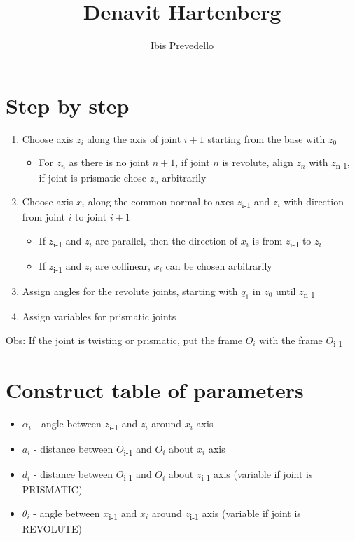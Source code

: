 \documentclass{article}
\begin{document}
\title{Denavit Hartenberg}
\author{Ibis Prevedello}

\maketitle

\section{Step by step}

\begin{enumerate}
	\item Choose axis $z_i$ along the axis of joint $i+1$ starting from the base with $z_0$
	\begin{itemize}
		\item For $z_n$ as there is no joint $n+1$, if joint $n$ is revolute, align $z_n$ with $z$\textsubscript{n-1}, if joint is prismatic chose $z_n$ arbitrarily
	\end{itemize}
	\item Choose axis $x_i$ along the common normal to axes $z$\textsubscript{i-1} and $z_i$ with direction from joint $i$ to joint $i+1$
	\begin{itemize}
		\item If $z$\textsubscript{i-1} and $z_i$ are parallel, then the direction of $x_i$ is from $z$\textsubscript{i-1} to $z_i$
		\item If $z$\textsubscript{i-1} and $z_i$ are collinear, $x_i$ can be chosen arbitrarily	
	\end{itemize}
\item Assign angles for the revolute joints, starting with $q_1$ in $z_0$ until $z$\textsubscript{n-1}
\item Assign variables for prismatic joints
\end{enumerate}

Obs: If the joint is twisting or prismatic, put the frame $O_i$ with the frame $O$\textsubscript{i-1}

\section{Construct table of parameters}
\begin{itemize}
	\item $\alpha_i$ - angle between $z$\textsubscript{i-1} and $z_i$ around $x_i$ axis
	\item $a_i$ - distance between $O$\textsubscript{i-1} and $O_i$ about $x_i$ axis
	\item $d_i$ - distance between $O$\textsubscript{i-1} and $O_i$ about $z$\textsubscript{i-1} axis (variable if joint is PRISMATIC)
	\item $\theta_i$ - angle between $x$\textsubscript{i-1} and $x_i$ around $z$\textsubscript{i-1} axis (variable if joint is REVOLUTE)
\end{itemize}
\end{document}
